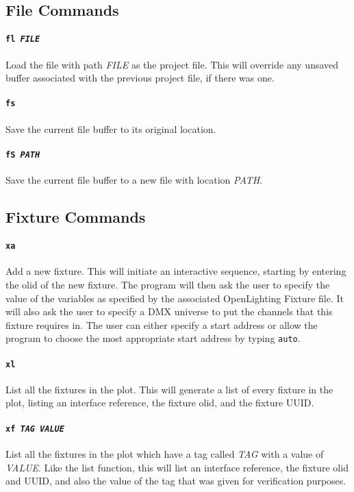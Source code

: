 \documentclass[a4paper]{article}
\begin{document}
\subsection{File Commands}

\paragraph{\texttt{fl \textit{FILE}}}
Load the file with path \textit{FILE} as the project file. This will override 
any unsaved buffer associated with the previous project file, if there was one.

\paragraph{\texttt{fs}}
Save the current file buffer to its original location.

\paragraph{\texttt{fS \textit{PATH}}}
Save the current file buffer to a new file with location \textit{PATH}.

\subsection{Fixture Commands}

\paragraph{\texttt{xa}}
Add a new fixture. This will initiate an interactive sequence, starting by 
entering the olid of the new fixture. The program will then ask the user to 
specify the value of the variables as specified by the associated 
OpenLighting Fixture file. It will also ask the user to specify a DMX universe 
to put the channels that this fixture requires in. The user can either 
specify a start address or allow the program to choose the most appropriate 
start address by typing \texttt{auto}.

\paragraph{\texttt{xl}}
List all the fixtures in the plot. This will generate a list of every fixture 
in the plot, listing an interface reference, the fixture olid, and the fixture 
UUID.

\paragraph{\texttt{xf \textit{TAG VALUE}}}
List all the fixtures in the plot which have a tag called \textit{TAG} with a 
value of \textit{VALUE}. Like the list function, this will list an interface 
reference, the fixture olid and UUID, and also the value of the tag that was 
given for verification purposes.
\end{document}
